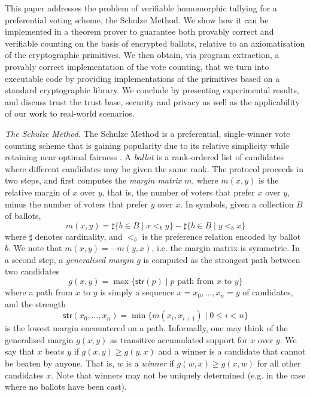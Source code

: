 \documentclass{llncs}
\newcommand{\str}{\mathsf{str}}
\begin{document}
This paper addresses the problem of verifiable homomorphic tallying
for a preferential voting scheme, the Schulze Method. We show
how it can be implemented in a theorem prover to
guarantee both provably correct and verifiable counting on the basis
of encrypted ballots, relative to an axiomatisation of the
cryptographic primitives. We then obtain, via program extraction, a
provably correct implementation of the vote counting, that we turn
into executable code by providing implementations of the primitives
based on a standard cryptographic library. We conclude by presenting
experimental results, and discuss trust the trust base, security and
privacy as well as the applicability of our work to real-world
scenarios. 

  \smallskip\noindent\emph{The Schulze Method.} The Schulze Method
  \cite{Schulze:2011:NMC} is a preferential, single-winner vote
  counting scheme that is gaining popularity due to its relative
  simplicity while retaining near optimal fairness
  \cite{Rivest:2010:OSW}.  
  A \emph{ballot} is a rank-ordered list of
  candidates where different candidates may be given the same rank.
  The protocol proceeds in two steps, and first computes the
  \emph{margin matrix} $m$, where $m(x, y)$ is the relative margin
  of $x$ over $y$, that is, the number of voters that prefer $x$
  over $y$, minus the number of voters that prefer $y$ over $x$. In
  symbols, given a collection $B$ of ballots, 
  \[ m(x, y) = \sharp\lbrace b \in B \mid x <_b y \rbrace
             - \sharp \lbrace b \in B \mid y <_b x \rbrace
  \]
  where $\sharp$ denotes cardinality, and $<_b$  is the preference
  relation encoded by ballot $b$. 
  We note that $m(x, y) = -m(y, x)$, i.e. the margin matrix is
  symmetric. In a second step, a \emph{generalised margin} $g$ is
  computed as the strongest path between two candidates
  \[ g(x,y) = \max \lbrace \str(p) \mid p \mbox{ path from $x$ to
  $y$} \rbrace \]
  where a path from $x$ to $y$ is simply a sequence $x = x_0, \dots,
  x_n = y$ of candidates, and the strength
  \[ \str(x_0, \dots, x_n) = \min \lbrace m(x_i, x_{i+1}) \mid 0
  \leq i < n
  \rbrace  \]
  is the lowest margin encountered on a path.
  Informally, one may think of the
  generalised margin $g(x, y)$ as transitive accumulated support for
  $x$ over $y$. We say that $x$ beats $y$ if $g(x,y) \geq g(y, x)$ and a
  winner is a candidate that cannot be beaten by anyone. 
  That is, $w$ is a \emph{winner} if $g(w, x) \geq g(x, w)$ for
  all other candidates $x$. Note that
  winners may not be uniquely determined (e.g. in the case where no
  ballots have been cast).
\end{document}
